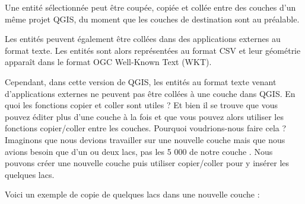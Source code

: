 Une entit\'e s\'electionn\'ee peut \^etre coup\'ee, copi\'ee et coll\'ee entre des couches d'un m\^eme projet QGIS, du moment que les couches de destination sont  au pr\'ealable.

Les entit\'es peuvent \'egalement \^etre coll\'ees dans des applications externes au format texte. Les entit\'es sont alors repr\'esent\'ees au format CSV et leur g\'eom\'etrie appara\^it dans le format OGC Well-Known Text (WKT).

Cependant, dans cette version de QGIS, les entit\'es au format texte venant d'applications externes ne peuvent pas \^etre coll\'ees \`a une couche dans QGIS. En quoi les fonctions copier et coller sont utiles ? Et bien il se trouve que vous pouvez \'editer plus d'une couche \`a la fois et que vous pouvez alors utiliser les fonctions copier/coller entre les couches. Pourquoi voudrions-nous faire cela ? Imaginons que nous devions travailler sur une nouvelle couche mais que nous avions besoin que d'un ou deux lacs, pas les 5 000 de notre couche . Nous pouvons cr\'eer une nouvelle couche puis utiliser copier/coller pour y ins\'erer les quelques lacs.

Voici un exemple de copie de quelques lacs dans une nouvelle couche :

